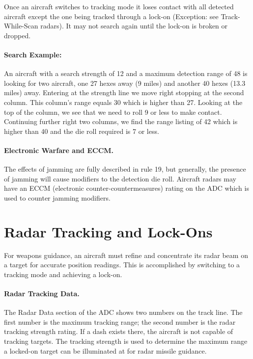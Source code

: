 Once an aircraft switches to tracking mode it loses contact with all detected aircraft except the one being tracked through a lock-on (Exception: see Track-While-Scan radars). It may not search again until the lock-on is broken or dropped. 

\paragraph{Search Example:} An aircraft with a search strength of 12 and a maximum detection range of 48 is looking for two aircraft, one 27 hexes away (9 miles) and another 40 hexes (13.3 miles) away. Entering at the strength line we move right stopping at the second column. This column's range equals 30 which is higher than 27. Looking at the top of the column, we see that we need to roll 9 or less to make contact. Continuing further right two columns, we find the range listing of 42 which is higher than 40 and the die roll required is 7 or less.

\paragraph{Electronic Warfare and ECCM.} The effects of jamming are fully described in rule 19, but generally, the presence of jamming will cause modifiers to the detection die roll. Aircraft radars may have an ECCM (electronic counter-countermeasures) rating on the ADC which is used to counter jamming modifiers.

\section{Radar Tracking and Lock-Ons}
\label{rule:radar-tracking-and-lock-ons}

For weapons guidance, an aircraft must refine and concentrate its radar beam on a target for accurate position readings. This is accomplished by switching to a tracking mode and achieving a lock-on.

\paragraph{Radar Tracking Data.} The Radar Data section of the ADC shows two numbers on the track line. The first number is the maximum tracking range; the second number is the radar tracking strength rating. If a dash exists there, the aircraft is not capable of tracking targets. The tracking strength is used to determine the maximum range a locked-on target can be illuminated at for radar missile guidance.

